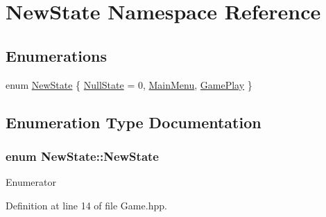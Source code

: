 \hypertarget{namespace_new_state}{\section{New\-State Namespace Reference}
\label{namespace_new_state}
}
\subsection*{Enumerations}
\begin{DoxyCompactItemize}
\item 
enum \hyperlink{namespace_new_state_a5c7ea0525ea511d1a4445581518dfca6}{New\-State} \{ \hyperlink{namespace_new_state_a5c7ea0525ea511d1a4445581518dfca6a1e9b87ca2bf0c6f85b1411f185f64b64}{Null\-State} = 0, 
\hyperlink{namespace_new_state_a5c7ea0525ea511d1a4445581518dfca6a617bb76697380d4786651efa9acf26d4}{Main\-Menu}, 
\hyperlink{namespace_new_state_a5c7ea0525ea511d1a4445581518dfca6a15eeddf82660caf82512f29ff322f27a}{Game\-Play}
 \}
\end{DoxyCompactItemize}


\subsection{Enumeration Type Documentation}
\hypertarget{namespace_new_state_a5c7ea0525ea511d1a4445581518dfca6}{
\subsubsection[{New\-State}]{\setlength{\rightskip}{0pt plus 5cm}enum {\bf New\-State\-::\-New\-State}}}\label{namespace_new_state_a5c7ea0525ea511d1a4445581518dfca6}
\begin{Desc}
\item[Enumerator]\par
\begin{description}
\item[{\em 
\hypertarget{namespace_new_state_a5c7ea0525ea511d1a4445581518dfca6a1e9b87ca2bf0c6f85b1411f185f64b64}{Null\-State}\label{namespace_new_state_a5c7ea0525ea511d1a4445581518dfca6a1e9b87ca2bf0c6f85b1411f185f64b64}
}]\item[{\em 
\hypertarget{namespace_new_state_a5c7ea0525ea511d1a4445581518dfca6a617bb76697380d4786651efa9acf26d4}{Main\-Menu}\label{namespace_new_state_a5c7ea0525ea511d1a4445581518dfca6a617bb76697380d4786651efa9acf26d4}
}]\item[{\em 
\hypertarget{namespace_new_state_a5c7ea0525ea511d1a4445581518dfca6a15eeddf82660caf82512f29ff322f27a}{Game\-Play}\label{namespace_new_state_a5c7ea0525ea511d1a4445581518dfca6a15eeddf82660caf82512f29ff322f27a}
}]\end{description}
\end{Desc}


Definition at line 14 of file Game.\-hpp.

